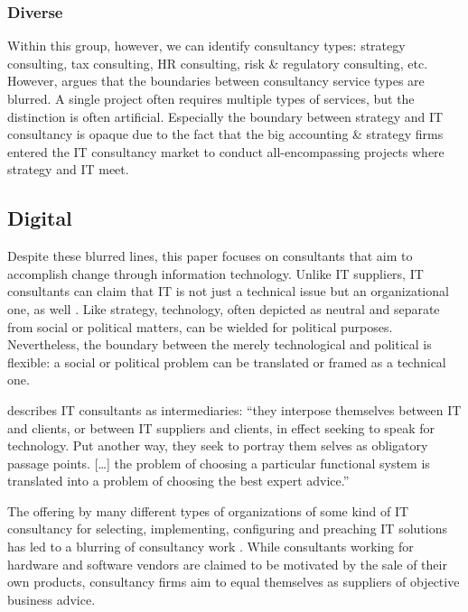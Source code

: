 \documentclass[12pt]{article}
\begin{document}
\hypertarget{diverse}{%
\subsubsection{Diverse}\label{diverse}}

Within this group, however, we can identify consultancy types: strategy
consulting, tax consulting, HR consulting, risk \& regulatory
consulting, etc. However, \citet[71-72]{armbruster2006} argues that the
boundaries between consultancy service types are blurred. A single
project often requires multiple types of services, but the distinction
is often artificial. Especially the boundary between strategy and IT
consultancy is opaque due to the fact that the big accounting \&
strategy firms entered the IT consultancy market to conduct
all-encompassing projects where strategy and IT meet.

\hypertarget{digital}{%
\subsection{Digital}\label{digital}}

Despite these blurred lines, this paper focuses on consultants that aim
to accomplish change through information technology. Unlike IT
suppliers, IT consultants can claim that IT is not just a technical
issue but an organizational one, as well \citep[ 24-25]{bloomfield1995}.
Like strategy, technology, often depicted as neutral and separate from
social or political matters, can be wielded for political purposes.
Nevertheless, the boundary between the merely technological and
political is flexible: a social or political problem can be translated
or framed as a technical one.

\citet[28]{bloomfield1995} describes IT consultants as intermediaries:
``they interpose themselves between IT and clients, or between IT
suppliers and clients, in effect seeking to speak for technology. Put
another way, they seek to portray them selves as obligatory passage
points. {[}\ldots{]} the problem of choosing a particular functional
system is translated into a problem of choosing the best expert
advice.''

The offering by many different types of organizations of some kind of IT
consultancy for selecting, implementing, configuring and preaching IT
solutions has led to a blurring of consultancy work \citetext{\citealp[
31]{bloomfield1995}; \citealp[ 162]{kipping2012}}. While consultants
working for hardware and software vendors are claimed to be motivated by
the sale of their own products, consultancy firms aim to equal
themselves as suppliers of objective business advice.
\end{document}
